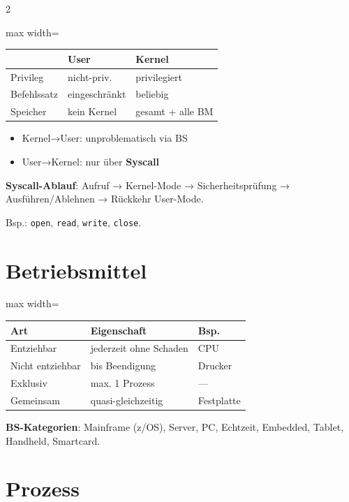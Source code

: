 \documentclass[10pt, a4paper]{article}
\begin{document}
\begin{multicols}{2}
{\small
\begin{adjustbox}{max width=\linewidth}
{\scriptsize
\begin{tabular}{lll}
\toprule
\textbf{} & \textbf{User} & \textbf{Kernel} \\
\midrule
Privileg & nicht-priv. & privilegiert \\
Befehlssatz & eingeschränkt & beliebig \\
Speicher & kein Kernel & gesamt + alle BM \\
\bottomrule
\end{tabular}
}
\end{adjustbox}
}


\begin{itemize}
  \item Kernel→User: unproblematisch via BS
  \item User→Kernel: nur über \textbf{Syscall}
\end{itemize}

\textbf{Syscall-Ablauf}: Aufruf → Kernel-Mode → Sicherheitsprüfung → Ausführen/Ablehnen → Rückkehr User-Mode.


Bsp.: \texttt{open}, \texttt{read}, \texttt{write}, \texttt{close}.



\section{Betriebsmittel}


{\small
\begin{adjustbox}{max width=\linewidth}
{\scriptsize
\begin{tabular}{lll}
\toprule
\textbf{Art} & \textbf{Eigenschaft} & \textbf{Bsp.} \\
\midrule
Entziehbar & jederzeit ohne Schaden & CPU \\
Nicht entziehbar & bis Beendigung & Drucker \\
Exklusiv & max. 1 Prozess & — \\
Gemeinsam & quasi-gleichzeitig & Festplatte \\
\bottomrule
\end{tabular}
}
\end{adjustbox}
}


\textbf{BS-Kategorien}: Mainframe (z/OS), Server, PC, Echtzeit, Embedded, Tablet, Handheld, Smartcard.



\section{Prozess}


\end{multicols}
\end{document}
